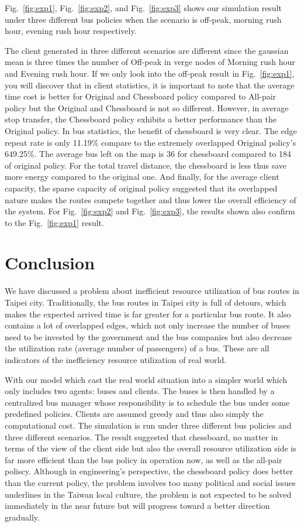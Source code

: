 \documentclass{sig-alternate}
\begin{document}
Fig.~\ref{fig:exp1}, Fig.~\ref{fig:exp2}, and Fig.~\ref{fig:exp3} shows our simulation result under three different bus policies when the scenario is off-peak, morning rush hour, evening rush hour respectively.

The client generated in three different scenarios are different since the gaussian mean is three times the number of Off-peak in verge nodes of Morning rush hour and Evening rush hour.
If we only look into the off-peak result in Fig.~\ref{fig:exp1}, you will discover that in client statistics, it is important to note that the average time cost is better for Original and Chessboard policy compared to All-pair policy but the Original and Chessboard is not so different. 
However, in average stop transfer, the Chessboard policy exhibits a better performance than the Original policy.
In bus statistics, the benefit of chessboard is very clear. 
The edge repeat rate is only 11.19\% compare to the extremely overlapped Original policy's 649.25\%.
The average bus left on the map is 36 for chessboard compared to 184 of original policy.
For the total travel distance, the chessboard is less thus save more energy compared to the original one.
And finally, for the average client capacity, the sparse capacity of original policy suggested that its overlapped nature makes the routes compete together and thus lower the overall efficiency of the system.
For Fig.~\ref{fig:exp2} and Fig.~\ref{fig:exp3}, the results shown also confirm to the Fig.~\ref{fig:exp1} result. 

\section{Conclusion}
We have discussed a problem about inefficient resource utilization of bus routes in Taipei city. 
Traditionally, the bus routes in Taipei city is full of detours, which makes the expected arrived time is far greater for a particular bus route. 
It also contains a lot of overlapped edges, which not only increase the number of buses need to be invested by the government and the bus companies but also decrease the utilization rate (average number of passengers) of a bus.
These are all indicators of the inefficiency resource utilization of real world.

With our model which cast the real world situation into a simpler world which only includes two agents: buses and clients.
The buses is then handled by a centralized bus manager whose responsibility is to schedule the bus under some predefined policies.
Clients are assumed greedy and thus also simply the computational cost.
The simulation is run under three different bus policies and three different scenarios.
The result suggested that chessboard, no matter in terms of the view of the client side but also the overall resource utilization side is far more efficient than the bus policy in operation now, as well as the all-pair poliscy.
Although in engineering's perspective, the chessboard policy does better than the current policy, the problem involves too many political and social issues underlines in the Taiwan local culture, the problem is not expected to be solved immediately in the near future but will progress toward a better direction gradually.
 
\end{document}
